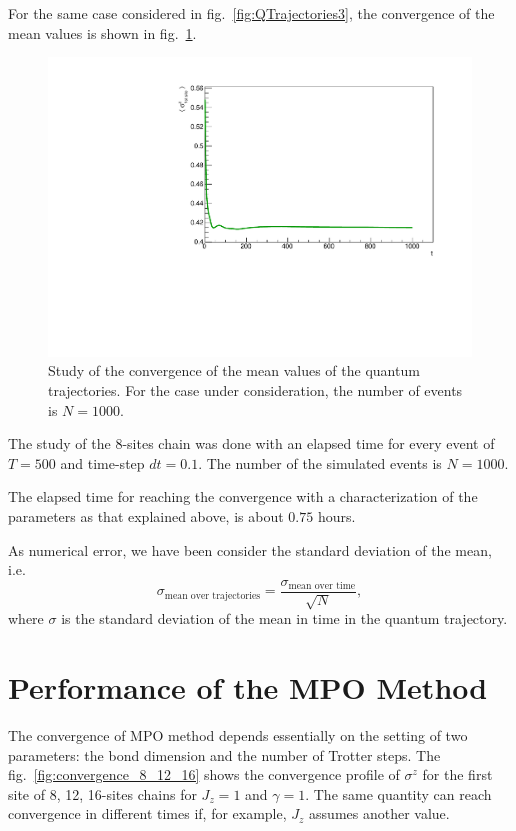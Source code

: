 For the same case considered in fig.~\ref{fig:QTrajectories3}, the convergence of the mean values is shown in fig.~\ref{fig:Convergence_s8J1051}. 

\begin{figure}[H]
    \centering
    \includegraphics[scale=0.6]{Figures/Convergence_s8J1051.pdf}
    \captionsetup{width=1.\linewidth}
    \caption{Study of the convergence of the mean values of the quantum trajectories. For the case under consideration, the number of events is $N = 1000$.}
    \label{fig:Convergence_s8J1051}
\end{figure}

The study of the 8-sites chain was done with an elapsed time for every event of $T = 500$ and time-step $dt = 0.1$. The number of the simulated events is $N = 1000$.

The elapsed time for reaching the convergence with a characterization of the parameters as that explained above, is about $0.75$ hours. 

As numerical error, we have been consider the standard deviation of the mean, i.e.
\begin{equation*}
    \sigma_{\text{mean over trajectories}} = \frac{\sigma_\text{mean over time}}{\sqrt{N}},
\end{equation*}
where $\sigma$ is the standard deviation of the mean in time in the quantum trajectory.


\section{Performance of the MPO Method}
The convergence of MPO method depends essentially on the setting of two parameters: the bond dimension and the number of Trotter steps. The fig.~\ref{fig:convergence_8_12_16} shows the convergence profile of $\sigma^z$ for the first site of 8, 12, 16-sites chains for $J_z = 1$ and $\gamma = 1$. The same quantity can reach convergence in different times if, for example, $J_z$ assumes another value. 

